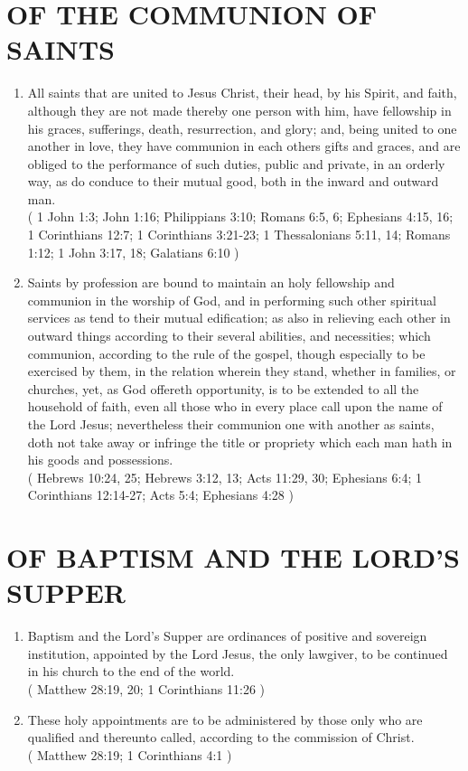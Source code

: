 \documentclass[12pt,a4paper]{book}
\begin{document}
\chapter{OF THE COMMUNION OF SAINTS}
\label{ch-com-sai}
\begin{enumerate}
\item All saints that are united to Jesus Christ, their head, by his Spirit, and faith, although they are not made thereby one person with him, have fellowship in his graces, sufferings, death, resurrection, and glory; and, being united to one another in love, they have communion in each others gifts and graces, and are obliged to the performance of such duties, public and private, in an orderly way, as do conduce to their mutual good, both in the inward and outward man.\\
( 1 John 1:3; John 1:16; Philippians 3:10; Romans 6:5, 6; Ephesians 4:15, 16; 1 Corinthians 12:7; 1 Corinthians 3:21-23; 1 Thessalonians 5:11, 14; Romans 1:12; 1 John 3:17, 18; Galatians 6:10 )
\item Saints by profession are bound to maintain an holy fellowship and communion in the worship of God, and in performing such other spiritual services as tend to their mutual edification; as also in relieving each other in outward things according to their several abilities, and necessities; which communion, according to the rule of the gospel, though especially to be exercised by them, in the relation wherein they stand, whether in families, or churches, yet, as God offereth opportunity, is to be extended to all the household of faith, even all those who in every place call upon the name of the Lord Jesus; nevertheless their communion one with another as saints, doth not take away or infringe the title or propriety which each man hath in his goods and possessions.\\
( Hebrews 10:24, 25; Hebrews 3:12, 13; Acts 11:29, 30; Ephesians 6:4; 1 Corinthians 12:14-27; Acts 5:4; Ephesians 4:28 )
\end{enumerate}

\chapter{OF BAPTISM AND THE LORD'S SUPPER}
\label{ch-ords}
\begin{enumerate}
\item Baptism and the Lord's Supper are ordinances of positive and sovereign institution, appointed by the Lord Jesus, the only lawgiver, to be continued in his church to the end of the world.\\
( Matthew 28:19, 20; 1 Corinthians 11:26 )
\item These holy appointments are to be administered by those only who are qualified and thereunto called, according to the commission of Christ.\\
( Matthew 28:19; 1 Corinthians 4:1 )
\end{enumerate}
\end{document}
